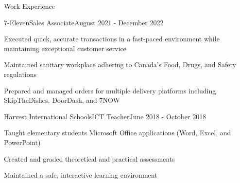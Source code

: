 \documentclass{article}
\newlength{\tabin}
\newlength{\secsep}
\newcommand{\lineunder}{\vspace*{-8pt} \\ \hspace*{-6pt} \hrulefill \\ \vspace*{-15pt}}
\newenvironment{tabbedsection}[1]{
    \begin{list}{}{
        \setlength{\itemsep}{0pt}
        \setlength{\labelsep}{0pt}
        \setlength{\labelwidth}{0pt}
        \setlength{\leftmargin}{\tabin}
        \setlength{\rightmargin}{\tabin}
        \setlength{\listparindent}{0pt}
        \setlength{\parsep}{0pt}
        \setlength{\parskip}{0pt}
        \setlength{\partopsep}{0pt}
        \setlength{\topsep}{#1}
    }
        \item[]
        }{
    \end{list}}
\newenvironment{resume_section}[1]{
    \vspace{2\secsep}
    \textsc{\large#1}
    \lineunder
    \begin{tabbedsection}{\secsep}
    }{\end{tabbedsection}}
\newenvironment{subitems}{
    \renewcommand{\labelitemi}{-}
    \begin{itemize}
        \setlength{\labelsep}{1em}
        }{
    \end{itemize}}
\newenvironment{resume_employer}[4]{
    \vspace{\secsep}
    \begin{minipage}[t]{0.75\linewidth}
        \textbf{#1}\\
        \small #2
    \end{minipage}%
    \begin{minipage}[t]{0.25\linewidth}
        \hfill \footnotesize #4
    \end{minipage}
    \vspace{0.1em}\\
    \begin{tabbedsection}{0pt}
        \begin{subitems}
        }{\end{subitems}
    \end{tabbedsection}}
\begin{document}
\begin{resume_section}{Work Experience}
        \begin{resume_employer}{7-Eleven}{Sales Associate}{}{August 2021 - December 2022}
            \item Executed quick, accurate transactions in a fast-paced environment while maintaining exceptional customer service
            \item Maintained sanitary workplace adhering to Canada's Food, Drugs, and Safety regulations
            \item Prepared and managed orders for multiple delivery platforms including SkipTheDishes, DoorDash, and 7NOW
        \end{resume_employer}

        \begin{resume_employer}{Harvest International Schools}{ICT Teacher}{}{June 2018 - October 2018}
            \item Taught elementary students Microsoft Office applications (Word, Excel, and PowerPoint)
            \item Created and graded theoretical and practical assessments
            \item Maintained a safe, interactive learning environment
        \end{resume_employer}
    \end{resume_section}
\end{document}
